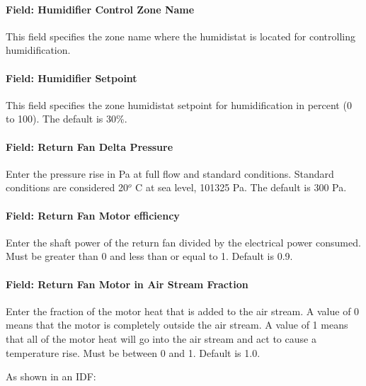 \paragraph{Field: Humidifier Control Zone Name}\label{field-humidifier-control-zone-name}

This field specifies the zone name where the humidistat is located for controlling humidification.

\paragraph{Field: Humidifier Setpoint}\label{field-humidifier-setpoint}

This field specifies the zone humidistat setpoint for humidification in percent (0 to 100). The default is 30\%.

\paragraph{Field: Return Fan Delta Pressure}\label{field-return-fan-delta-pressure}

Enter the pressure rise in Pa at full flow and standard conditions. Standard conditions are considered 20\(^{o}\) C at sea level, 101325 Pa. The default is 300 Pa.

\paragraph{Field: Return Fan Motor efficiency}\label{field-return-fan-motor-efficiency}

Enter the shaft power of the return fan divided by the electrical power consumed. Must be greater than 0 and less than or equal to 1. Default is 0.9.

\paragraph{Field: Return Fan Motor in Air Stream Fraction}\label{field-return-fan-motor-in-air-stream-fraction}

Enter the fraction of the motor heat that is added to the air stream. A value of 0 means that the motor is completely outside the air stream. A value of 1 means that all of the motor heat will go into the air stream and act to cause a temperature rise. Must be between 0 and 1. Default is 1.0.

As shown in an IDF:

